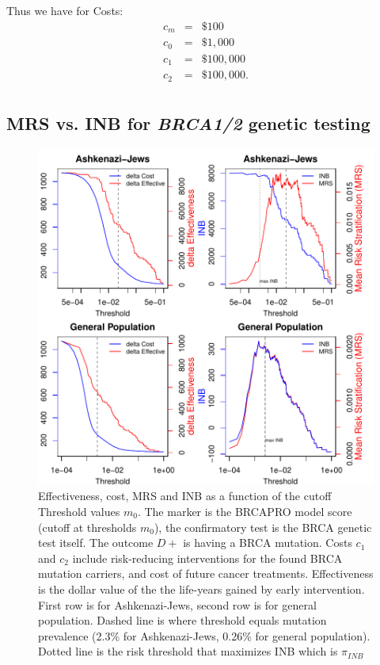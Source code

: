 \documentclass[11pt]{article}
\begin{document}
Thus we have for Costs:
\begin{eqnarray*}
  c_m &=& \$100 \\
  c_0 &=& \$1,000 \\
  c_1 &=& \$100,000 \\
  c_2 &=& \$100,000. \\
\end{eqnarray*}


\subsection{MRS vs. INB for \textit{BRCA1/2} genetic testing}


\begin{figure}
\begin{center}
\includegraphics{CostEff1timeScreen-MRS_INB}
\end{center}
\label{fig:two}
\caption{Effectiveness, cost, MRS and INB as a function of the cutoff Threshold values $m_0$.  The marker is the BRCAPRO model score (cutoff at thresholds $m_0$), the confirmatory test is the BRCA genetic test itself.  The outcome $D+$ is having a BRCA mutation.  Costs $c_1$ and $c_2$ include risk-reducing interventions for the found BRCA mutation carriers, and cost of future cancer treatments. Effectiveness is the dollar value of the the life-years gained by early intervention.  First row is for Ashkenazi-Jews, second row is for general population.  Dashed line is where threshold equals mutation prevalence (2.3\% for Ashkenazi-Jews, 0.26\% for general population).  Dotted line is the risk threshold that maximizes INB which is $\pi_{INB}$}
\end{figure}
\end{document}
